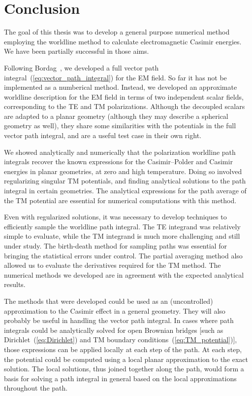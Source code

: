 \chapter{Conclusion}

The goal of this thesis was to develop a general purpose numerical method
employing the worldline method to calculate electromagnetic Casimir energies. 
We have been partially successful in those aims.   %

Following Bordag~\cite{Bordag1998,Bordag1999}, we developed a full vector path integral~(\ref{eq:vector_path_integral}) for
the EM field.  So far it has not be implemented as a numberical method.
Instead, we developed an approximate worldline description for the EM field in terms of two independent scalar fields, corresponding 
to the TE and TM polarizations.   
Although the decoupled scalars are adapted to a planar geometry (although they may describe
a spherical geometry as well), they share some similarities with the potentials in the full vector
path integral, and are a useful test case in their own right.  

We showed analytically and numerically that the polarization worldline path integrals recover the known expressions for the 
Casimir--Polder and Casimir energies in planar geometries, at zero and high temperature.  
Doing so involved regularizing singular TM potentials, and finding analytical solutions to the path integral
in certain geometries.  The analytical expressions for the path average of the TM potential are 
 essential for numerical computations with this method.  

Even with regularized solutions, it was necessary to develop techniques to efficiently
sample the worldline path integral.  The TE integrand was relatively simple to evaluate, while the TM
integrand is much more challenging and still under study.
The birth-death method for sampling paths was essential for bringing the statistical errors under control.
The partial averaging method also allowed us to evaluate the derivatives required for the TM method.
The numerical methods we developed are in agreement with the expected analytical results.

The methods that were developed could be used as an (uncontrolled) approximation to the Casimir effect in a general geometry.
They will also probably be useful in handling the vector path integral.    
In cases where path integrals could be analytically solved for open Brownian bridges [such as
Dirichlet~(\ref{eq:Dirichlet}) and TM boundary conditions~(\ref{eq:TM_potential})], 
those expressions can be applied locally at each step of the  path.  
At each step, the potential could be computed using a local planar approximation to the exact solution.
The local solutions, thus joined together along the path, would form a basis for solving a path integral
in general based on the local approximations throughout the path.  


